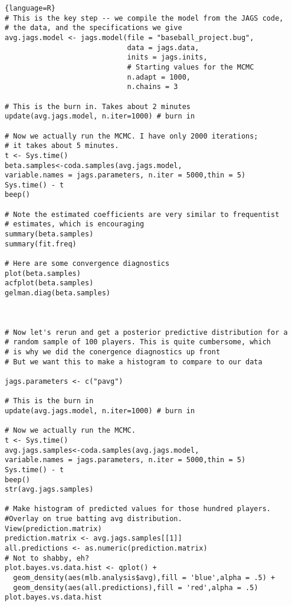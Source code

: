 \documentclass[10pt,a4paper]{article}
\begin{document}
\begin{lstlisting}{language=R}
# This is the key step -- we compile the model from the JAGS code, 
# the data, and the specifications we give
avg.jags.model <- jags.model(file = "baseball_project.bug", 
                             data = jags.data, 
                             inits = jags.inits, 
                             # Starting values for the MCMC
                             n.adapt = 1000, 
                             n.chains = 3 

# This is the burn in. Takes about 2 minutes
update(avg.jags.model, n.iter=1000) # burn in

# Now we actually run the MCMC. I have only 2000 iterations; 
# it takes about 5 minutes.
t <- Sys.time()
beta.samples<-coda.samples(avg.jags.model, 
variable.names = jags.parameters, n.iter = 5000,thin = 5)
Sys.time() - t
beep()

# Note the estimated coefficients are very similar to frequentist 
# estimates, which is encouraging
summary(beta.samples)
summary(fit.freq)

# Here are some convergence diagnostics
plot(beta.samples)
acfplot(beta.samples)
gelman.diag(beta.samples)



# Now let's rerun and get a posterior predictive distribution for a 
# random sample of 100 players. This is quite cumbersome, which 
# is why we did the conergence diagnostics up front
# But we want this to make a histogram to compare to our data

jags.parameters <- c("pavg") 

# This is the burn in
update(avg.jags.model, n.iter=1000) # burn in

# Now we actually run the MCMC. 
t <- Sys.time()
avg.jags.samples<-coda.samples(avg.jags.model, 
variable.names = jags.parameters, n.iter = 5000,thin = 5)
Sys.time() - t
beep()
str(avg.jags.samples)

# Make histogram of predicted values for those hundred players. 
#Overlay on true batting avg distribution.
View(prediction.matrix)
prediction.matrix <- avg.jags.samples[[1]]
all.predictions <- as.numeric(prediction.matrix)
# Not to shabby, eh?
plot.bayes.vs.data.hist <- qplot() + 
  geom_density(aes(mlb.analysis$avg),fill = 'blue',alpha = .5) +
  geom_density(aes(all.predictions),fill = 'red',alpha = .5)
plot.bayes.vs.data.hist
\end{lstlisting}
\end{document}
